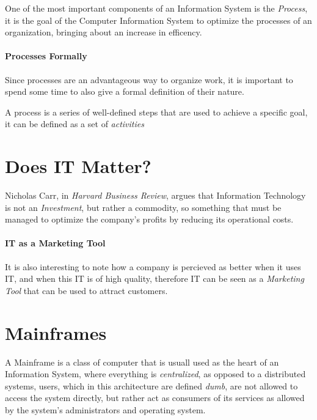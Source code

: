 \documentclass[openright, twoside, twocolumn]{report}
\begin{document}
    One of the most important components of an Information System is the \emph{Process}, it is
    the goal of the Computer Information System to optimize the processes of an organization,
    bringing about an increase in efficency.

    \paragraph{Processes Formally}
    Since processes are an advantageous way to organize work, it is important to spend some time to
    also give a formal definition of their nature.

    \begin{definition}
      \label{def:proc}
      A process is a series of well-defined steps that are used to achieve a specific goal, it can
      be defined as a set of \emph{activities}
    \end{definition}

    \section{Does IT Matter?}
    Nicholas Carr, in \emph{Harvard Business Review}, argues that Information Technology is not an \emph{Investment},
    but rather a commodity, so something that must be managed to optimize the company's profits by reducing its
    operational costs.

    \paragraph{IT as a Marketing Tool}
    It is also interesting to note how a company is percieved as better when it uses IT, and when this IT is
    of high quality, therefore IT can be seen as a \emph{Marketing Tool} that can be used to attract customers.


    \section{Mainframes}

    A Mainframe is a class of computer that is usuall used as the heart of an Information System, where
    everything is \emph{centralized}, as opposed to a distributed systems, users, which in this
    architecture are defined \emph{dumb}, are not allowed to access the system directly, but rather
    act as consumers of its services as allowed by the system's administrators and operating system.
\end{document}
